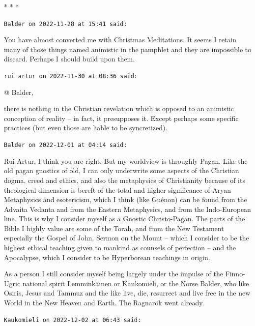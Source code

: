 
\begin{center}* * *\end{center}

\begin{footnotesize}\begin{sffamily}
\texttt{Balder on 2022-11-28 at 15:41 said:}

You have almost converted me with Christmas Meditations. It seems I retain many of those things named animistic in the pamphlet and they are impossible to discard. Perhaps I should build upon them.

\hfill

\texttt{rui artur on 2022-11-30 at 08:36 said:}

{@} Balder,

there is nothing in the Christian revelation which is opposed to an animistic conception of reality – in fact, it presupposes it. Except perhaps some specific practices (but even those are liable to be syncretized).

\hfill

\texttt{Balder on 2022-12-01 at 04:14 said:}

Rui Artur, I think you are right. But my worldview is throughly Pagan. Like the old pagan gnostics of old, I can only underwrite some aspects of the Christian dogma, creed and ethics, and also the metaphysics of Christianity because of its theological dimension is bereft of the total and higher significance of Aryan Metaphysics and esotericism, which I think (like Guénon) can be found from the Advaita Vedanta and from the Eastern Metaphysics, and from the Indo-European line. This is why I consider myself as a Gnostic Christo-Pagan. The parts of the Bible I highly value are some of the Torah, and from the New Testament especially the Gospel of John, Sermon on the Mount – which I consider to be the highest ethical teaching given to mankind as counsels of perfection – and the Apocalypse, which I consider to be Hyperborean teachings in origin.

As a person I still consider myself being largely under the impulse of the Finno-Ugric national spirit Lemminkäinen or Kaukomieli, or the Norse Balder, who like Osiris, Jesus and Tammuz and the like live, die, resurrect and live free in the new World in the New Heaven and Earth. The Ragnarök went already.

\hfill

\texttt{Kaukomieli on 2022-12-02 at 06:43 said:}


\end{sffamily}
\end{footnotesize}
